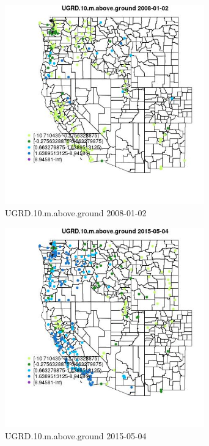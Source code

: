 \begin{figure} 
\centering  
\includegraphics[width=0.77\textwidth]{Code_Outputs/Report_ML_input_PM25_Step4_part_e_de_duplicated_aves_compiled_2019-05-18wNAs_MapObsUGRD10maboveground2008-01-02.jpg} 
\caption{\label{fig:Report_ML_input_PM25_Step4_part_e_de_duplicated_aves_compiled_2019-05-18wNAsMapObsUGRD10maboveground2008-01-02}UGRD.10.m.above.ground 2008-01-02} 
\end{figure} 
 

\clearpage 

\begin{figure} 
\centering  
\includegraphics[width=0.77\textwidth]{Code_Outputs/Report_ML_input_PM25_Step4_part_e_de_duplicated_aves_compiled_2019-05-18wNAs_MapObsUGRD10maboveground2015-05-04.jpg} 
\caption{\label{fig:Report_ML_input_PM25_Step4_part_e_de_duplicated_aves_compiled_2019-05-18wNAsMapObsUGRD10maboveground2015-05-04}UGRD.10.m.above.ground 2015-05-04} 
\end{figure} 
 

